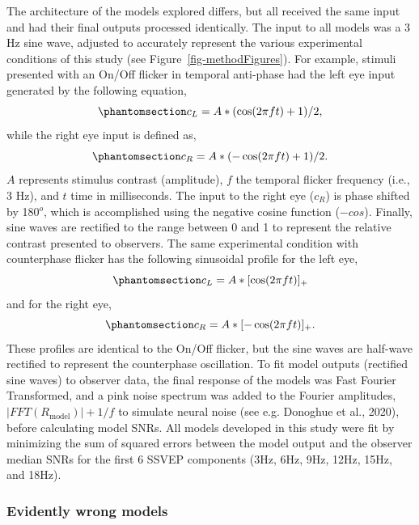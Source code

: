 \documentclass[
  12pt,
]{article}
\begin{document}
The architecture of the models explored differs, but all received the
same input and had their final outputs processed identically. The input
to all models was a 3 Hz sine wave, adjusted to accurately represent the
various experimental conditions of this study (see
Figure~\ref{fig-methodFigures}). For example, stimuli presented with an
On/Off flicker in temporal anti-phase had the left eye input generated
by the following equation,
\begin{equation}\phantomsection\label{eq-stimInput2L}{
c_L = A * (\cos(2 \pi ft)+1)/2,
}\end{equation} while the right eye input is defined as,
\begin{equation}\phantomsection\label{eq-stimInput2R}{
c_R = A * (-\cos(2 \pi ft)+1)/2.
}\end{equation} \(A\) represents stimulus contrast (amplitude), \(f\)
the temporal flicker frequency (i.e., 3 Hz), and \(t\) time in
milliseconds. The input to the right eye (\(c_R\)) is phase shifted by
180\(^o\), which is accomplished using the negative cosine function
(\(-cos\)). Finally, sine waves are rectified to the range between 0 and
1 to represent the relative contrast presented to observers. The same
experimental condition with counterphase flicker has the following
sinusoidal profile for the left eye,
\begin{equation}\phantomsection\label{eq-stimInput3L}{
c_L = A * [\cos(2 \pi ft)]_+
}\end{equation} and for the right eye,
\begin{equation}\phantomsection\label{eq-stimInput3R}{
c_R = A * [-\cos(2 \pi ft)]_+.
}\end{equation} These profiles are identical to the On/Off flicker, but
the sine waves are half-wave rectified to represent the counterphase
oscillation. To fit model outputs (rectified sine waves) to observer
data, the final response of the models was Fast Fourier Transformed, and
a pink noise spectrum was added to the Fourier amplitudes,
\(|FFT(R_\text{model})|+1/f\) to simulate neural noise (see e.g.
Donoghue et al., 2020), before calculating model SNRs. All models
developed in this study were fit by minimizing the sum of squared errors
between the model output and the observer median SNRs for the first 6
SSVEP components (3Hz, 6Hz, 9Hz, 12Hz, 15Hz, and 18Hz).

\subsubsection{Evidently wrong models}\label{evidently-wrong-models}
\end{document}
